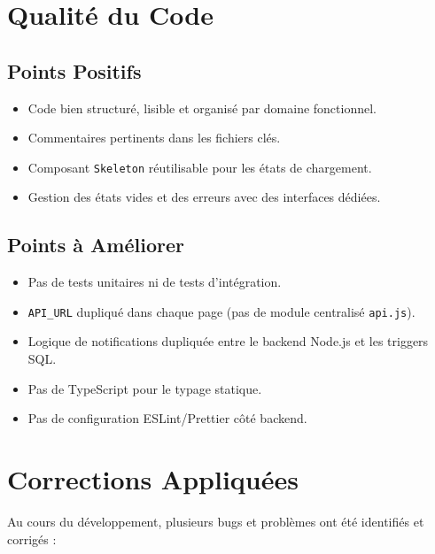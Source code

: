 \documentclass[12pt, a4paper]{report}
\begin{document}
\section{Qualité du Code}

\subsection{Points Positifs}

\begin{itemize}
    \item Code bien structuré, lisible et organisé par domaine fonctionnel.
    \item Commentaires pertinents dans les fichiers clés.
    \item Composant \texttt{Skeleton} réutilisable pour les états de chargement.
    \item Gestion des états vides et des erreurs avec des interfaces dédiées.
\end{itemize}

\subsection{Points à Améliorer}

\begin{itemize}
    \item Pas de tests unitaires ni de tests d'intégration.
    \item \texttt{API\_URL} dupliqué dans chaque page (pas de module centralisé \texttt{api.js}).
    \item Logique de notifications dupliquée entre le backend Node.js et les triggers SQL.
    \item Pas de TypeScript pour le typage statique.
    \item Pas de configuration ESLint/Prettier côté backend.
\end{itemize}

\section{Corrections Appliquées}

Au cours du développement, plusieurs bugs et problèmes ont été identifiés et corrigés :
\end{document}
